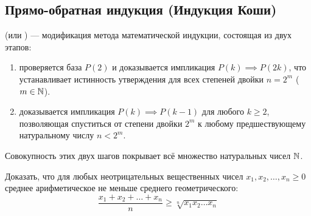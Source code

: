 \subsection{Прямо-обратная индукция (Индукция Коши)}

\begin{definition}
     (или ) --- 
    модификация метода математической индукции, состоящая из двух этапов:
    \begin{enumerate}
        \item {} проверяется 
        база $P(2)$ и доказывается импликация $P(k) \implies P(2k)$, что 
        устанавливает истинность утверждения для всех степеней двойки 
        $n = 2^m$ ($m \in \mathbb{N}$).
        \item {} доказывается импликация 
        $P(k) \implies P(k - 1)$ для любого $k \ge 2$, позволяющая 
        спуститься от степени двойки $2^m$ к любому предшествующему 
        натуральному числу $n < 2^m$.
    \end{enumerate}
    Совокупность этих двух шагов покрывает всё множество натуральных чисел 
    $\mathbb{N}$.
\end{definition}

\begin{problem}
    Доказать, что для любых неотрицательных вещественных чисел 
    $x_1, x_2, \dots, x_n \ge 0$ среднее арифметическое не меньше среднего 
    геометрического:
    \begin{equation} \label{eq:am_gm}
        \frac{x_1 + x_2 + \dots + x_n}{n} \ge \sqrt[n]{x_1 x_2 \dots x_n} 
        \tag{7}
    \end{equation}
\end{problem}

